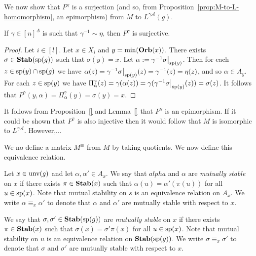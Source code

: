 \documentclass[../main/thesis.tex]{subfiles}
\begin{document}
We now show that $P^{\gamma}$ is a surjection (and so, from
Proposition~\ref{prop:M-to-L-homomorphism}, an epimorphism) from $M$ to
$L^{\gamma \mathcal{A}}(g)$.

\begin{lem} 
	If $\gamma \in [n]^{\underline{A}}$ is such that $\gamma^{-1} \sim \eta$, then
  $P^{\gamma}$ is surjective.
  \label{lem:M-to-L-surjective}
\end{lem}
\begin{proof}
  Let $i \in [l]$. Let $x \in X_i$ and $y = \min(\text{\textbf{Orb}}(x))$. There exists $\sigma
  \in \text{\textbf{Stab}} (\text{sp} (g))$ such that $\sigma (y) = x$. Let $\alpha := \gamma^{-1}
  \restr{\sigma}{\consp(y)}$. Then for each $z \in \text{sp}(y) \cap \text{sp}(g)$ we
  have $\alpha(z) = \gamma^{-1} \restr{\sigma}{\consp(y)} (z) = \gamma^{-1}(z) =
  \eta (z)$, and so $\alpha \in A_y$. For each $z \in \text{sp}(y)$ we have
  $\Pi^{\gamma}_\alpha(z) = \gamma (\alpha(z)) = \gamma(\gamma^{-1}
  \restr{\sigma}{\consp(y)}(z)) = \sigma (z)$. It follows that $P^{\gamma}(y,
  \alpha) = \Pi^{\gamma}_\alpha(y) = \sigma (y) = x$.
\end{proof}

It follows from Proposition~\ref{} and Lemma~\ref{} that $P^{\gamma}$ is an
epimorphism. If it could be shown that $P^{\gamma}$ is also injective then it
would follow that $M$ is isomorphic to $L^{\gamma \mathcal{A}}$. However,...

We no define a matrix $M^{\equiv}$ from $M$ by taking quotients. We now define
this equivalence relation.

\begin{definition}
  Let $x \in \text{unv}(g)$ and let $\alpha, \alpha' \in A_x$. We say that
  $alpha$ and $\alpha$ are \emph{mutually stable} on $x$ if there exists $\pi
  \in \text{\textbf{Stab}}(x)$ such that $\alpha (u) = \alpha' (\pi (u))$ for all $u \in
  \text{sp}(x)$. Note that mutual stability on $s$ is an equivalence relation on
  $A_x$. We write $\alpha \equiv_x \alpha'$ to denote that $\alpha$ and
  $\alpha'$ are mutually stable with respect to $x$.
  
  We say that $\sigma, \sigma' \in \text{\textbf{Stab}} (\text{sp} (g))$ are \emph{mutually stable} on $x$
  if there exists $\pi \in \text{\textbf{Stab}}(x)$ such that $\sigma (x) = \sigma' \pi (x)$
  for all $u \in \text{sp}(x)$. Note that mutual stability on $u$ is an equivalence
  relation on $\text{\textbf{Stab}} (\text{sp} (g))$. We write $\sigma \equiv_x \sigma'$ to denote that
  $\sigma$ and $\sigma'$ are mutually stable with respect to $x$.
\end{definition}
\end{document}
